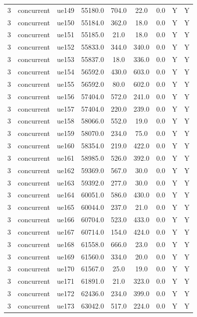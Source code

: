 \begin{table}[ht]
\begin{tabular}{|c|c|c|c|c|c|c|c|c|}
3 & concurrent & ue149 & 55180.0 & 704.0 & 22.0 & 0.0 & Y & Y \\
3 & concurrent & ue150 & 55184.0 & 362.0 & 18.0 & 0.0 & Y & Y \\
3 & concurrent & ue151 & 55185.0 & 21.0 & 18.0 & 0.0 & Y & Y \\
3 & concurrent & ue152 & 55833.0 & 344.0 & 340.0 & 0.0 & Y & Y \\
3 & concurrent & ue153 & 55837.0 & 18.0 & 336.0 & 0.0 & Y & Y \\
3 & concurrent & ue154 & 56592.0 & 430.0 & 603.0 & 0.0 & Y & Y \\
3 & concurrent & ue155 & 56592.0 & 80.0 & 602.0 & 0.0 & Y & Y \\
3 & concurrent & ue156 & 57404.0 & 572.0 & 241.0 & 0.0 & Y & Y \\
3 & concurrent & ue157 & 57404.0 & 220.0 & 239.0 & 0.0 & Y & Y \\
3 & concurrent & ue158 & 58066.0 & 552.0 & 19.0 & 0.0 & Y & Y \\
3 & concurrent & ue159 & 58070.0 & 234.0 & 75.0 & 0.0 & Y & Y \\
3 & concurrent & ue160 & 58354.0 & 219.0 & 422.0 & 0.0 & Y & Y \\
3 & concurrent & ue161 & 58985.0 & 526.0 & 392.0 & 0.0 & Y & Y \\
3 & concurrent & ue162 & 59369.0 & 567.0 & 30.0 & 0.0 & Y & Y \\
3 & concurrent & ue163 & 59392.0 & 277.0 & 30.0 & 0.0 & Y & Y \\
3 & concurrent & ue164 & 60051.0 & 586.0 & 430.0 & 0.0 & Y & Y \\
3 & concurrent & ue165 & 60044.0 & 237.0 & 21.0 & 0.0 & Y & Y \\
3 & concurrent & ue166 & 60704.0 & 523.0 & 433.0 & 0.0 & Y & Y \\
3 & concurrent & ue167 & 60714.0 & 154.0 & 424.0 & 0.0 & Y & Y \\
3 & concurrent & ue168 & 61558.0 & 666.0 & 23.0 & 0.0 & Y & Y \\
3 & concurrent & ue169 & 61560.0 & 334.0 & 20.0 & 0.0 & Y & Y \\
3 & concurrent & ue170 & 61567.0 & 25.0 & 19.0 & 0.0 & Y & Y \\
3 & concurrent & ue171 & 61891.0 & 21.0 & 323.0 & 0.0 & Y & Y \\
3 & concurrent & ue172 & 62436.0 & 234.0 & 399.0 & 0.0 & Y & Y \\
3 & concurrent & ue173 & 63042.0 & 517.0 & 224.0 & 0.0 & Y & Y \\

\end{tabular}
\end{table}
